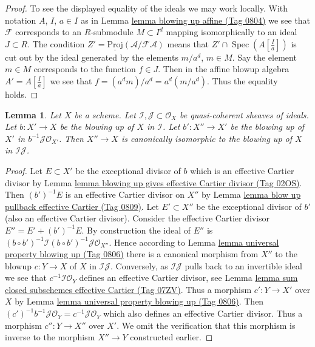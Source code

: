 \documentclass{amsart}
\theoremstyle{plain}
\newtheorem{lemma}[subsection]{Lemma}
\theoremstyle{definition}
\theoremstyle{remark}
\numberwithin{equation}{subsection}
\def\Spec{\mathop{\mathrm{Spec}}}
\begin{document}
\begin{proof}
\medskip\noindent
To see the displayed equality of the ideals we may work locally.
With notation $A$, $I$, $a \in I$ as in Lemma \href{https://stacks.math.columbia.edu/tag/0804}{lemma blowing up affine (Tag 0804)}
we see that $\mathcal{F}$ corresponds to an $R$-submodule $M \subset I^d$
mapping isomorphically to an ideal $J \subset R$. The condition
$Z' = \underline{\text{Proj}}(\mathcal{A}/\mathcal{F}\mathcal{A})$
means that $Z' \cap \Spec(A[\frac{I}{a}])$ is cut out by the ideal
generated by the elements $m/a^d$, $m \in M$. Say the element $m \in M$
corresponds to the function $f \in J$. Then in the affine blowup algebra
$A' = A[\frac{I}{a}]$ we see that $f = (a^dm)/a^d = a^d (m/a^d)$.
Thus the equality holds.
\end{proof}


\begin{lemma}
\label{divisors-lemma-blowing-up-two-ideals}
Let $X$ be a scheme. Let $\mathcal{I}, \mathcal{J} \subset \mathcal{O}_X$
be quasi-coherent sheaves of ideals. Let $b : X' \to X$
be the blowing up of $X$ in $\mathcal{I}$. Let $b' : X'' \to X'$ be the
blowing up of $X'$ in $b^{-1}\mathcal{J} \mathcal{O}_{X'}$. Then $X'' \to X$
is canonically isomorphic to the blowing up of $X$ in $\mathcal{I}\mathcal{J}$.
\end{lemma}

\begin{proof}
Let $E \subset X'$ be the exceptional divisor of $b$ which is an effective
Cartier divisor by
Lemma \href{https://stacks.math.columbia.edu/tag/02OS}{lemma blowing up gives effective Cartier divisor (Tag 02OS)}.
Then $(b')^{-1}E$ is an effective Cartier divisor on $X''$ by
Lemma \href{https://stacks.math.columbia.edu/tag/0809}{lemma blow up pullback effective Cartier (Tag 0809)}.
Let $E' \subset X''$ be the exceptional divisor of $b'$ (also an effective
Cartier divisor). Consider the effective Cartier divisor
$E'' = E' + (b')^{-1}E$. By construction the ideal of $E''$ is
$(b \circ b')^{-1}\mathcal{I} (b \circ b')^{-1}\mathcal{J} \mathcal{O}_{X''}$.
Hence according to Lemma \href{https://stacks.math.columbia.edu/tag/0806}{lemma universal property blowing up (Tag 0806)}
there is a canonical morphism from $X''$ to the blowup $c : Y \to X$
of $X$ in $\mathcal{I}\mathcal{J}$. Conversely, as $\mathcal{I}\mathcal{J}$
pulls back to an invertible ideal we see that
$c^{-1}\mathcal{I}\mathcal{O}_Y$ defines
an effective Cartier divisor, see
Lemma \href{https://stacks.math.columbia.edu/tag/07ZV}{lemma sum closed subschemes effective Cartier (Tag 07ZV)}.
Thus a morphism $c' : Y \to X'$ over $X$ by
Lemma \href{https://stacks.math.columbia.edu/tag/0806}{lemma universal property blowing up (Tag 0806)}.
Then $(c')^{-1}b^{-1}\mathcal{J}\mathcal{O}_Y = c^{-1}\mathcal{J}\mathcal{O}_Y$
which also defines an effective Cartier divisor. Thus a morphism
$c'' : Y \to X''$ over $X'$. We omit the verification that this
morphism is inverse to the morphism $X'' \to Y$ constructed earlier.
\end{proof}
\end{document}
